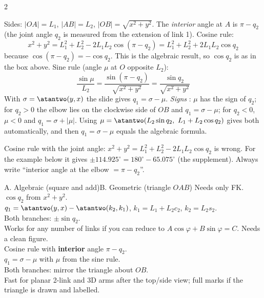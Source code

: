 \begin{multicols}{2}
\begin{deriv}
Sides: $|OA|=L_1$, $|AB|=L_2$, $|OB|=\sqrt{x^2+y^2}$. The \emph{interior} angle at $A$ is $\pi-q_2$ (the joint angle $q_2$ is measured from the extension of link 1). Cosine rule:
\[x^2+y^2=L_1^2+L_2^2-2L_1L_2\cos(\pi-q_2)=L_1^2+L_2^2+2L_1L_2\cos q_2\]
because $\cos(\pi-q_2)=-\cos q_2$. This is the algebraic result, so $\cos q_2$ is as in the box above. Sine rule (angle $\mu$ at $O$ opposite $L_2$):
\[\frac{\sin\mu}{L_2}=\frac{\sin(\pi-q_2)}{\sqrt{x^2+y^2}}=\frac{\sin q_2}{\sqrt{x^2+y^2}}\]
With $\sigma=\atantwo(y,x)$ the slide gives $q_1=\sigma-\mu$. \emph{Signs} \added: $\mu$ has the sign of $q_2$; for $q_2>0$ the elbow lies on the clockwise side of $OB$ and $q_1=\sigma-\mu$; for $q_2<0$, $\mu<0$ and $q_1=\sigma+|\mu|$. Using $\mu=\atantwo(L_2\sin q_2,\ L_1+L_2\cos q_2)$ gives both automatically, and then $q_1=\sigma-\mu$ equals the algebraic formula.
\end{deriv}
\begin{trap}
Cosine rule with the joint angle: $x^2+y^2=L_1^2+L_2^2-2L_1L_2\cos q_2$ is wrong. For the example below it gives $\pm114.925^\circ=180^\circ-65.075^\circ$ (the supplement). Always write ``interior angle at the elbow $=\pi-q_2$''. \chk
\end{trap}

\begin{twoway}{A. Algebraic (square and add)}{B. Geometric (triangle $OAB$)}
Needs only FK.\\
$\cos q_2$ from $x^2+y^2$.\\
$q_1=\atantwo(y,x)-\atantwo(k_2,k_1)$, $k_1=L_1+L_2c_2$, $k_2=L_2s_2$.\\
Both branches: $\pm\sin q_2$.\\
Works for any number of links if you can reduce to $A\cos\varphi+B\sin\varphi=C$.
\tcblower
Needs a clean figure.\\
Cosine rule with \textbf{interior} angle $\pi-q_2$.\\
$q_1=\sigma-\mu$ with $\mu$ from the sine rule.\\
Both branches: mirror the triangle about $OB$.\\
Fast for planar 2-link and 3D arms after the top/side view; full marks if the triangle is drawn and labelled.
\end{twoway}


\end{multicols}
